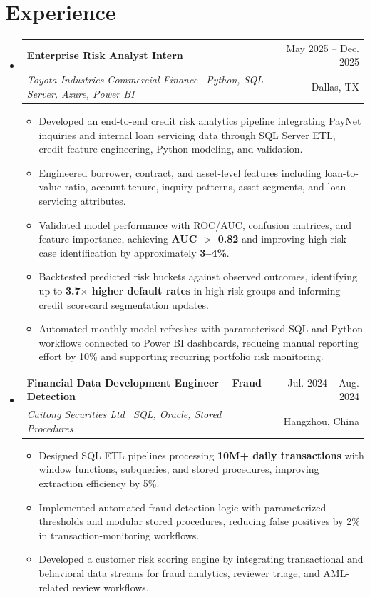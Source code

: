 \documentclass[letterpaper,10pt]{article}
\makeatletter
\newcommand{\resumeItem}[1]{\item\footnotesize{#1\vspace{-2pt}}}
\newcommand{\resumeSubheading}[4]{
  \vspace{-2pt}\item
    \begin{tabular*}{0.985\textwidth}[t]{l@{\extracolsep{\fill}}r}
      \textbf{#1} & \small #2 \\
      \textit{\small #3} & \small #4 \\
    \end{tabular*}\vspace{-4pt}
}
\newcommand{\resumeSubHeadingListStart}{\begin{itemize}[leftmargin=0.11in,label={}]}
\newcommand{\resumeSubHeadingListEnd}{\end{itemize}\vspace{-2pt}}
\newcommand{\resumeItemListStart}{\begin{itemize}[leftmargin=0.17in,itemsep=1.5pt,topsep=2pt,label={$\bullet$}]}
\newcommand{\resumeItemListEnd}{\end{itemize}\vspace{1pt}}
\makeatother
\begin{document}
\section{Experience}
\resumeSubHeadingListStart
\resumeSubheading{Enterprise Risk Analyst Intern}{May 2025 -- Dec. 2025}{Toyota Industries Commercial Finance \textbar\ Python, SQL Server, Azure, Power BI}{Dallas, TX}
\resumeItemListStart
\resumeItem{Developed an end-to-end credit risk analytics pipeline integrating PayNet inquiries and internal loan servicing data through SQL Server ETL, credit-feature engineering, Python modeling, and validation.}
\resumeItem{Engineered borrower, contract, and asset-level features including loan-to-value ratio, account tenure, inquiry patterns, asset segments, and loan servicing attributes.}
\resumeItem{Validated model performance with ROC/AUC, confusion matrices, and feature importance, achieving \textbf{AUC $>$ 0.82} and improving high-risk case identification by approximately \textbf{3--4\%}.}
\resumeItem{Backtested predicted risk buckets against observed outcomes, identifying up to \textbf{3.7$\times$ higher default rates} in high-risk groups and informing credit scorecard segmentation updates.}
\resumeItem{Automated monthly model refreshes with parameterized SQL and Python workflows connected to Power BI dashboards, reducing manual reporting effort by 10\% and supporting recurring portfolio risk monitoring.}
\resumeItemListEnd

\resumeSubheading{Financial Data Development Engineer -- Fraud Detection}{Jul. 2024 -- Aug. 2024}{Caitong Securities Ltd \textbar\ SQL, Oracle, Stored Procedures}{Hangzhou, China}
\resumeItemListStart
\resumeItem{Designed SQL ETL pipelines processing \textbf{10M+ daily transactions} with window functions, subqueries, and stored procedures, improving extraction efficiency by 5\%.}
\resumeItem{Implemented automated fraud-detection logic with parameterized thresholds and modular stored procedures, reducing false positives by 2\% in transaction-monitoring workflows.}
\resumeItem{Developed a customer risk scoring engine by integrating transactional and behavioral data streams for fraud analytics, reviewer triage, and AML-related review workflows.}
\resumeItemListEnd

\resumeSubHeadingListEnd
\end{document}
